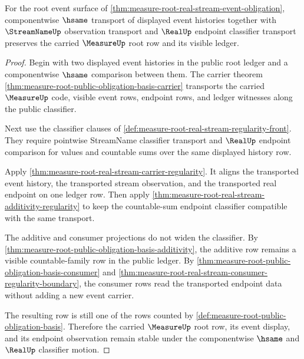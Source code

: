 \begin{theorem}
\label{thm:measure-root-event-classifier-stability}
For the root event surface of
\autoref{thm:measure-root-real-stream-event-obligation}, componentwise
$\hsame$ transport of displayed event histories together with
$\StreamNameUp$ observation transport and $\RealUp$ endpoint classifier
transport preserves the carried $\MeasureUp$ root row and its visible ledger.
\end{theorem}
\begin{proof}
Begin with two displayed event histories in the public root ledger and a
componentwise $\hsame$ comparison between them. The carrier theorem
\autoref{thm:measure-root-public-obligation-basis-carrier} transports the
carried $\MeasureUp$ code, visible event rows, endpoint rows, and ledger
witnesses along the public classifier.

Next use the classifier clauses of
\autoref{def:measure-root-real-stream-regularity-front}. They require
pointwise StreamName classifier transport and $\RealUp$ endpoint comparison
for values and countable sums over the same displayed history row.

Apply \autoref{thm:measure-root-real-stream-carrier-regularity}. It aligns
the transported event history, the transported stream observation, and the
transported real endpoint on one ledger row. Then apply
\autoref{thm:measure-root-real-stream-additivity-regularity} to keep the
countable-sum endpoint classifier compatible with the same transport.

The additive and consumer projections do not widen the classifier. By
\autoref{thm:measure-root-public-obligation-basis-additivity}, the additive
row remains a visible countable-family row in the public ledger. By
\autoref{thm:measure-root-public-obligation-basis-consumer} and
\autoref{thm:measure-root-real-stream-consumer-regularity-boundary}, the
consumer rows read the transported endpoint data without adding a new event
carrier.

The resulting row is still one of the rows counted by
\autoref{def:measure-root-public-obligation-basis}. Therefore the carried
$\MeasureUp$ root row, its event display, and its endpoint observation remain
stable under the componentwise $\hsame$ and $\RealUp$ classifier motion.
\end{proof}

